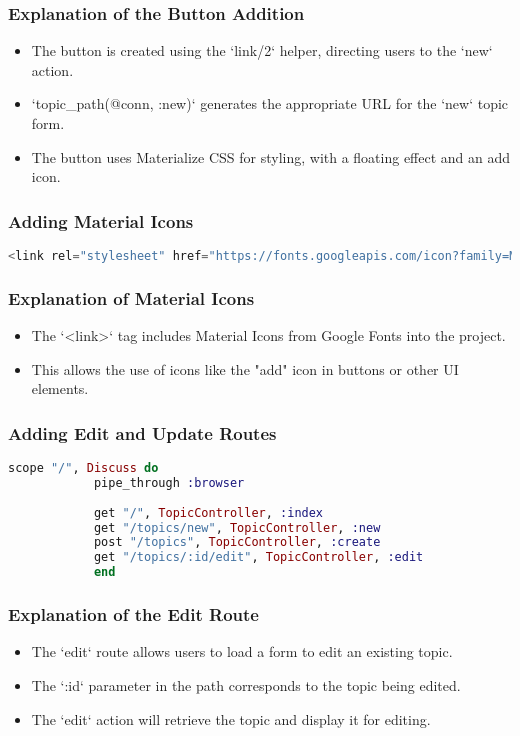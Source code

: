 \documentclass[aspectratio=169, table]{beamer}
\begin{document}
	\begin{frame}
		\frametitle{Explanation of the Button Addition}
		\begin{itemize}
			\item The button is created using the `link/2` helper, directing users to the `new` action.
			\item `topic\_path(@conn, :new)` generates the appropriate URL for the `new` topic form.
			\item The button uses Materialize CSS for styling, with a floating effect and an add icon.
		\end{itemize}
	\end{frame}
	
	\begin{frame}[fragile]
		\frametitle{Adding Material Icons}
		\begin{lstlisting}[language=elixir]
			<link rel="stylesheet" href="https://fonts.googleapis.com/icon?family=Material+Icons">
		\end{lstlisting}
	\end{frame}
	
	\begin{frame}
		\frametitle{Explanation of Material Icons}
		\begin{itemize}
			\item The `<link>` tag includes Material Icons from Google Fonts into the project.
			\item This allows the use of icons like the "add" icon in buttons or other UI elements.
		\end{itemize}
	\end{frame}
	
	\begin{frame}[fragile]
		\frametitle{Adding Edit and Update Routes}
		\begin{lstlisting}[language=Elixir]
			scope "/", Discuss do
			pipe_through :browser
			
			get "/", TopicController, :index
			get "/topics/new", TopicController, :new
			post "/topics", TopicController, :create
			get "/topics/:id/edit", TopicController, :edit
			end
		\end{lstlisting}
	\end{frame}
	
	\begin{frame}
		\frametitle{Explanation of the Edit Route}
		\begin{itemize}
			\item The `edit` route allows users to load a form to edit an existing topic.
			\item The `:id` parameter in the path corresponds to the topic being edited.
			\item The `edit` action will retrieve the topic and display it for editing.
		\end{itemize}
	\end{frame}
	
\end{document}
